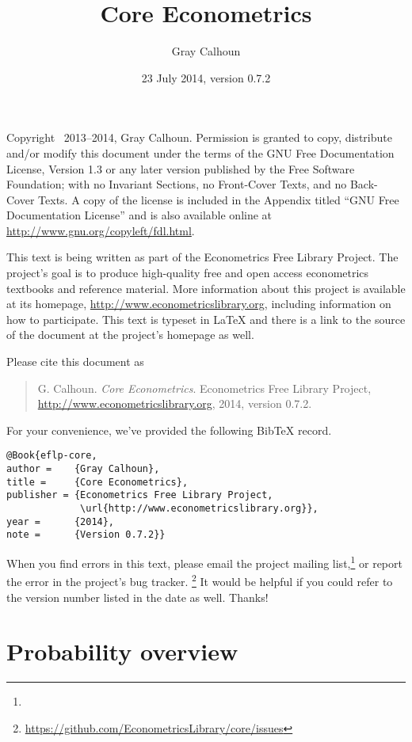 \documentclass[12pt,notitlepage]{report}
\title{Core Econometrics}
\author{Gray Calhoun}
\date{23 July 2014, version 0.7.2}
\begin{document}
\maketitle

\bigskip\noindent%
Copyright \textcopyright\ 2013--2014, Gray Calhoun.
Permission is granted to copy, distribute and/or modify this document
under the terms of the GNU Free Documentation License, Version 1.3 or
any later version published by the Free Software Foundation; with no
Invariant Sections, no Front-Cover Texts, and no Back-Cover Texts.  A
copy of the license is included in the Appendix titled ``GNU Free
Documentation License'' and is also available online at
\url{http://www.gnu.org/copyleft/fdl.html}.

This text is being written as part of the Econometrics Free Library
Project.  The project's goal is to produce high-quality free and
open access econometrics textbooks and reference material.  More
information about this project is available at its homepage,
\url{http://www.econometricslibrary.org}, including information on how
to participate.  This text is typeset in LaTeX and there is a link
to the source of the document at the project's homepage as well.

Please cite this document as
\begin{quote}\raggedright
  G. Calhoun. \textit{Core Econometrics}. Econometrics Free Library
  Project, \url{http://www.econometricslibrary.org}, 2014, version
  0.7.2.
\end{quote}
For your convenience, we've provided the following BibTeX record.
\begin{Verbatim}
@Book{eflp-core,
author =    {Gray Calhoun},
title =     {Core Econometrics},
publisher = {Econometrics Free Library Project,
             \url{http://www.econometricslibrary.org}},
year =      {2014},
note =      {Version 0.7.2}}
\end{Verbatim}
When you find errors in this text, please email the project mailing
list,\footnote{} or report
the error in the project's bug tracker.%
\footnote{\url{https://github.com/EconometricsLibrary/core/issues}}
It would be helpful if you could refer to the version number listed in
the date as well.  Thanks!

\tableofcontents

\chapter{Probability overview}





\end{document}
